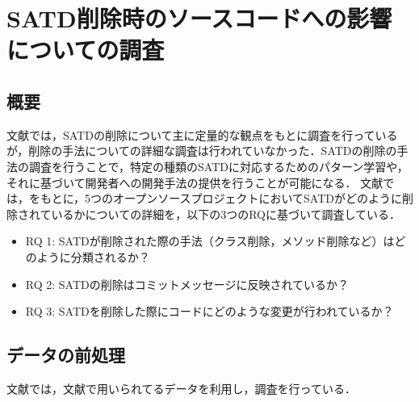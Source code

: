 \section{SATD削除時のソースコードへの影響についての調査\cite{satd-real-removal}}
\subsection{概要}
文献\cite{satd-removal}では，SATDの削除について主に定量的な観点をもとに調査を行っているが，削除の手法についての詳細な調査は行われていなかった．SATDの削除の手法の調査を行うことで，特定の種類のSATDに対応するためのパターン学習や，それに基づいて開発者への開発手法の提供を行うことが可能になる．
文献\cite{satd-real-removal}では，\cite{satd-removal}をもとに，5つのオープンソースプロジェクトにおいてSATDがどのように削除されているかについての詳細を，以下の3つのRQに基づいて調査している．

\begin{itemize}
  \item RQ 1: SATDが削除された際の手法（クラス削除，メソッド削除など）はどのように分類されるか？
  \item RQ 2: SATDの削除はコミットメッセージに反映されているか？
  \item RQ 3: SATDを削除した際にコードにどのような変更が行われているか？
\end{itemize}


\subsection{データの前処理}
文献\cite{satd-real-removal}では，文献\cite{satd-removal}で用いられてるデータを利用し，調査を行っている．

